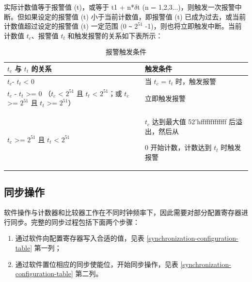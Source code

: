 \documentclass[main\_\_CN.tex]{subfiles}
\begin{document}
实际计数值等于报警值 (t)，或等于 t1 + n*$\delta$t (n = 1,2,3...)，则触发一次报警中断。但如果设定的报警值 (t) 小于当前计数值，即报警值 (t) 已成为过去，或当前计数值超过设定的报警值  (t) 一定范围 (0 \verb+~+ $2^{51}$ -1)，则也将立即触发中断。当前计数值 $t_{c}$、报警值 $t_{t}$ 和触发报警的关系如下表所示：

\begin{longtable}[c]{ | p{4cm} | p{6.5cm} |}
\caption{报警触发条件}
\\\hline
\rowcolor{lightgray}
\textbf{$t_{c}$ 与 $t_{t}$ 的关系}  & \textbf{触发条件} \\ \hline
$t_{c}$- $t_{t}$ < 0 & 当 $t_{c}$ = $t_{t}$ 时，触发报警\\ \hline
$t_{c}$ - $t_{t}$ >= 0 \newline （$t_{c}$ < $2^{51}$ 且 $t_{t}$ < $2^{51}$；\newline 或 $t_{c}$ >= $2^{51}$ 且 $t_{t}$ >= $2^{51}$）& 立即触发报警\\ \hline
\multirow{2}{*}{$t_{c}$ >= $2^{51}$ 且 $t_{t}$ < $2^{51}$} & $t_{c}$ 达到最大值 52'hfffffffffffff 后溢出，然后从

0 开始计数，计数达到 $t_{t}$ 时触发报警 \\ \hline
\end{longtable}

\subsection{同步操作}
软件操作与计数器和比较器工作在不同时钟频率下，因此需要对部分配置寄存器进行同步。完整的同步过程包括下面两个步骤：

\begin{enumerate}
    \item 通过软件向配置寄存器写入合适的值，见表 \ref{synchronization-configuration-table} 第一列；
    \item 通过软件置位相应的同步使能位，开始同步操作，见表  \ref{synchronization-configuration-table} 第二列。
\end{enumerate}
\end{document}
